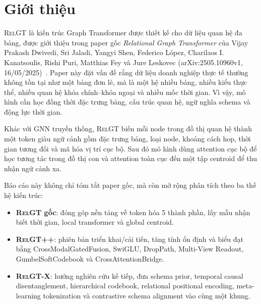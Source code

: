 \documentclass[12pt,a4paper]{article}
\newcommand{\RelGT}{\textsc{RelGT}}
\newcommand{\RelGTpp}{\textsc{RelGT++}}
\newcommand{\RelGTx}{\textsc{RelGT-X}}
\begin{document}
\renewcommand{\contentsname}{Mục lục}
\clearpage
\thispagestyle{plain}
\tableofcontents
\clearpage

\section{Giới thiệu}

\begin{summarybox}
\RelGT{} là kiến trúc Graph Transformer được thiết kế cho dữ liệu quan hệ
đa bảng, được giới thiệu trong paper gốc \textit{Relational Graph Transformer}
của Vijay Prakash Dwivedi, Sri Jaladi, Yangyi Shen, Federico López,
Charilaos I. Kanatsoulis, Rishi Puri, Matthias Fey và Jure Leskovec
(arXiv:2505.10960v1, 16/05/2025)~\cite{relgt2025}. Paper này đặt vấn đề rằng
dữ liệu doanh nghiệp thực tế thường không tồn tại như một bảng đơn lẻ, mà là
một hệ nhiều bảng, nhiều kiểu thực thể, nhiều quan hệ khóa chính--khóa ngoại
và nhiều mốc thời gian. Vì vậy, mô hình cần học đồng thời đặc trưng bảng,
cấu trúc quan hệ, ngữ nghĩa schema và động lực thời gian.

Khác với GNN truyền thống, \RelGT{} biến mỗi node trong đồ thị quan hệ thành
một token giàu ngữ cảnh gồm đặc trưng bảng, loại node, khoảng cách hop,
thời gian tương đối và mã hóa vị trí cục bộ. Sau đó mô hình dùng attention
cục bộ để học tương tác trong đồ thị con và attention toàn cục đến một tập
centroid để thu nhận ngữ cảnh xa.
\end{summarybox}

Báo cáo này không chỉ tóm tắt paper gốc, mà còn mở rộng phân tích theo ba
thế hệ kiến trúc:
\begin{itemize}
  \item \textbf{\RelGT{} gốc}: đóng góp nền tảng về token hóa 5 thành phần,
        lấy mẫu nhận biết thời gian, local transformer và global centroid.
  \item \textbf{\RelGTpp{}}: phiên bản triển khai/cải tiến, tăng tính ổn định
        và biểu đạt bằng CrossModalGatedFusion, SwiGLU, DropPath,
        Multi-View Readout, GumbelSoftCodebook và CrossAttentionBridge.
  \item \textbf{\RelGTx{}}: hướng nghiên cứu kế tiếp, đưa schema prior,
        temporal causal disentanglement, hierarchical codebook, relational
        positional encoding, meta-learning tokenization và contrastive schema
        alignment vào cùng một khung.
\end{itemize}
\end{document}
